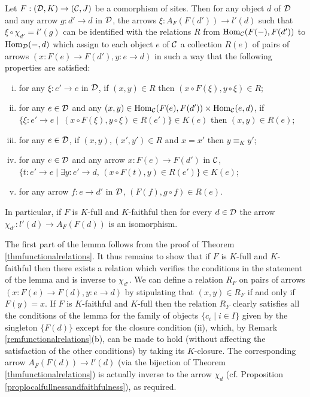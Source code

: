 \documentclass[a4paper,12pt]{article}
\begin{document}
\begin{lemma}\label{lemmacomorphisminclusion}
Let $F:({\cal D}, K)\to ({\cal C}, J)$ be a comorphism of sites. Then for any object $d$ of $\cal D$ and any arrow $g:d'\to d$ in $\cal D$, the arrows $\xi:A_{F}(F(d'))\to l'(d)$ such that $\xi\circ \chi_{d'}=l'(g)$ can be identified with the relations $R$ from $\textup{Hom}_{\cal C}(F(-),F(d'))$ to $\textup{Hom}_{\cal D}(-,d)$ which assign to each object $e$ of $\cal C$ a collection $R(e)$ of pairs of arrows $(x:F(e)\to F(d'), y:e\to d)$ in such a way that the following properties are satisfied:
		\begin{enumerate}[(i)]
		\item for any $\xi:e'\to e$ in $\cal D$, if $(x, y)\in R$ then $(x\circ F(\xi), y\circ \xi)\in R$;	
		
		\item  for any $e\in {\cal D}$ and any $(x, y)\in \textup{Hom}_{\cal C}(F(e), F(d'))\times \textup{Hom}_{\cal C}(e,d)$, if $\{\xi:e'\to e \mid\ (x\circ F(\xi), y\circ \xi)\in R(e')\}\in K(e)$ then $(x,y)\in R(e)$;
			
		\item for any $e\in {\cal D}$, if $(x, y), (x', y')\in R$ and $x=x'$ then $y\equiv_{K} y'$;  
				 			
		\item for any $e\in {\cal D}$ and any arrow $x:F(e)\to F(d')$ in $\cal C$, $\{t:e'\to e \mid \exists y:e'\to d, \,(x\circ F(t), y)\in R(e') \}\in K(e)$;
		
		\item for any arrow $f:e\to d'$ in $\cal D$, $(F(f), g\circ f)\in R(e)$.	
\end{enumerate}
In particular, if $F$ is $K$-full and $K$-faithful then for every $d\in {\cal D}$ the arrow $\chi_{d'}:l'(d)\to A_{F}(F(d))$ is an isomorphism.
\end{lemma}

\begin{proofs}
The first part of the lemma follows from the proof of Theorem \ref{thmfunctionalrelations}. It thus remains to show that if $F$ is $K$-full and $K$-faithful then there exists a relation which verifies the conditions in the statement of the lemma and is inverse to $\chi_{d'}$. We can define a relation $R_{F}$ on pairs of arrows $(x:F(e)\to F(d), y:e\to d)$ by stipulating that $(x,y)\in R_{F}$ if and only if $F(y)=x$. If $F$ is $K$-faithful and $K$-full then the relation $R_{F}$ clearly satisfies all the conditions of the lemma for the family of objects $\{c_{i} \mid i\in I\}$ given by the singleton $\{F(d)\}$ except for the closure condition (ii), which, by Remark \ref{remfunctionalrelations}(b), can be made to hold (without affecting the satisfaction of the other conditions) by taking its $K$-closure. The corresponding arrow $A_{F}(F(d))\to l'(d)$ (via the bijection of Theorem \ref{thmfunctionalrelations}) is actually inverse to the arrow $\chi_{d}$ (cf. Proposition \ref{proplocalfullnessandfaithfulness}), as required. 	
\end{proofs}
\end{document}
